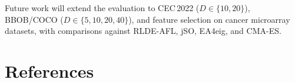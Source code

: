 \documentclass[preprint,12pt,authoryear]{elsarticle}
\begin{document}
Future work will extend the evaluation to CEC\,2022 ($D \in \{10, 20\}$), BBOB/COCO ($D \in \{5, 10, 20, 40\}$), and feature selection on cancer microarray datasets, with comparisons against RLDE-AFL, jSO, EA4eig, and CMA-ES.


\section*{References}

\begingroup
\renewcommand{\section}[2]{}
\end{document}

